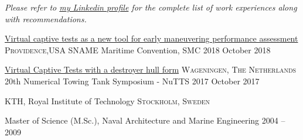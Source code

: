 \documentclass[10pt,a4paper]{article} %
\begin{document}
\begin{center}
\textit{Please refer to \href{https://www.linkedin.com/in/martin-alexandersson-77823312/}{my Linkedin profile} for the complete list of work experiences along with recommendations.}
\end{center}


\spacedhrule{-0.2em}{-0.4em} %



\headedsection 
{\href{https://www.researchgate.net/publication/332671240_Virtual_captive_tests_as_a_new_tool_for_early_maneuvering_performance_assessment}{Virtual captive tests as a new tool for early maneuvering performance assessment}}
{\textsc{Providence,USA}} {
\headedsubsection %
{SNAME Maritime Convention, SMC 2018}
{October 2018}
{\bodytext{ }}
}

\headedsection 
{\href{https://www.researchgate.net/publication/320299350_Virtual_Captive_Tests_with_a_destroyer_hull_form}{Virtual Captive Tests with a destroyer hull form}}
{\textsc{Wageningen, The Netherlands}} {
\headedsubsection %
{20th Numerical Towing Tank Symposium - NuTTS 2017}
{October 2017}
{\bodytext{ }}
}

 



\spacedhrule{0.5em}{-0.4em} %




\headedsection %
{KTH, Royal Institute of Technology}
{\textsc{Stockholm, Sweden}} {

\headedsubsection %
{Master of Science (M.Sc.), Naval Architecture and Marine Engineering}
{2004 -- 2009}
{\bodytext{ }}
}
\end{document}
